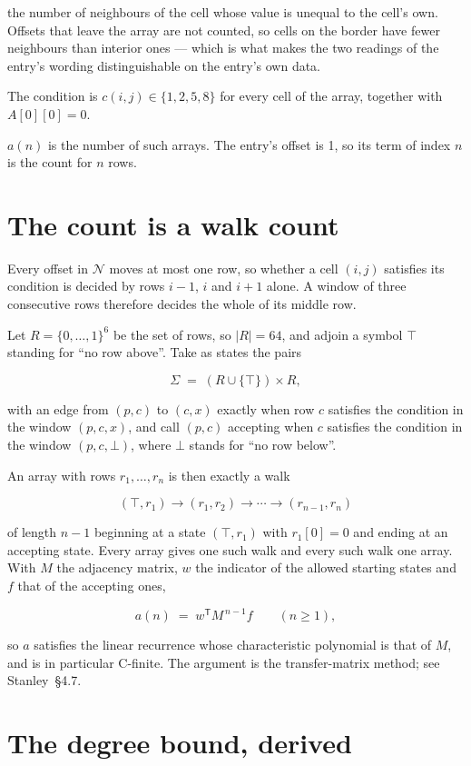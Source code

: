 \documentclass[11pt]{article}
\theoremstyle{definition}
\begin{document}
the number of neighbours of the cell whose value is unequal to the cell's own. Offsets that leave the array are not counted, so cells on the border have fewer neighbours than interior ones --- which is what makes the two readings of the entry's wording distinguishable on the entry's own data.

The condition is $c(i,j) \in \{1, 2, 5, 8\}$ for every cell of the array, together with $A[0][0]=0$.

$a(n)$ is the number of such arrays. The entry's offset is 1, so its term of index $n$ is the count for $n$ rows.

\section{The count is a walk count}

Every offset in $\mathcal{N}$ moves at most one row, so whether a cell $(i,j)$ satisfies its condition is decided by rows $i-1$, $i$ and $i+1$ alone. A window of three consecutive rows therefore decides the whole of its middle row.

Let $R = \{0,\dots,1\}^{6}$ be the set of rows, so $|R| = 64$, and adjoin a symbol $\top$ standing for ``no row above''. Take as states the pairs

\[\Sigma \;=\; (R \cup \{\top\}) \times R,\]

with an edge from $(p,c)$ to $(c,x)$ exactly when row $c$ satisfies the condition in the window $(p,c,x)$, and call $(p,c)$ accepting when $c$ satisfies the condition in the window $(p,c,\bot)$, where $\bot$ stands for ``no row below''.

An array with rows $r_1,\dots,r_n$ is then exactly a walk

\[(\top,r_1) \to (r_1,r_2) \to \cdots \to (r_{n-1},r_n)\]

of length $n-1$ beginning at a state $(\top,r_1)$ with $r_1[0]=0$ and ending at an accepting state. Every array gives one such walk and every such walk one array. With $M$ the adjacency matrix, $w$ the indicator of the allowed starting states and $f$ that of the accepting ones,

\[a(n) \;=\; w^{\mathsf T} M^{\,n-1} f \qquad (n \ge 1),\]

so $a$ satisfies the linear recurrence whose characteristic polynomial is that of $M$, and is in particular C-finite. The argument is the transfer-matrix method; see Stanley~\S4.7.

\section{The degree bound, derived}
\end{document}
